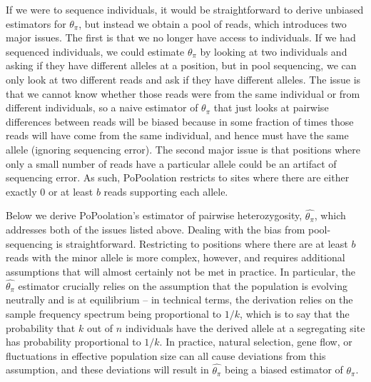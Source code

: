 \documentclass[letterpaper,fontsize=9pt,DIV=12]{scrartcl}
\newcommand{\samplesize}{n}
\newcommand{\thetapi}{\widehat{\theta_\pi}}
\begin{document}
If we were to sequence individuals, it would be straightforward to derive unbiased estimators for $\theta_\pi$, but instead we obtain a pool of reads, which introduces two major issues.  The first is that we no longer have access to individuals.  If we had sequenced individuals, we could estimate $\theta_\pi$ by looking at two individuals and asking if they have different alleles at a position, but in pool sequencing, we can only look at two different reads and ask if they have different alleles.  The issue is that we cannot know whether those reads were from the same individual or from different individuals, so a naive estimator of $\theta_\pi$ that just looks at pairwise differences between reads will be biased because in some fraction of times those reads will have come from the same individual, and hence must have the same allele (ignoring sequencing error).  The second major issue is that positions where only a small number of reads have a particular allele could be an artifact of sequencing error.  As such, PoPoolation restricts to sites where there are either exactly $0$ or at least $b$ reads supporting each allele.

Below we derive PoPoolation's estimator of pairwise heterozygosity, $\thetapi$, which addresses both of the issues listed above.  Dealing with the bias from pool-sequencing is straightforward.  Restricting to positions where there are at least $b$ reads with the minor allele is more complex, however, and requires additional assumptions that will almost certainly not be met in practice.  In particular, the $\thetapi$ estimator crucially relies on the assumption that the population is evolving neutrally and is at equilibrium -- in technical terms, the derivation relies on the sample frequency spectrum being proportional to $1/k$, which is to say that the probability that $k$ out of $\samplesize$ individuals have the derived allele at a segregating site has probability proportional to $1/k$.  In practice, natural selection, gene flow, or fluctuations in effective population size can all cause deviations from this assumption, and these deviations will result in $\thetapi$ being a biased estimator of $\theta_\pi$.


\end{document}
